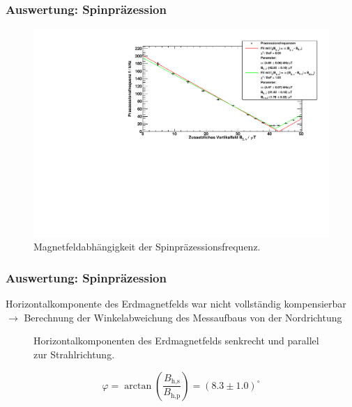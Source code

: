 \begin{frame}
\frametitle{Auswertung: Spinpräzession}

\begin{figure}
    \centering
    \includegraphics[width=\textwidth]{../img/Rb85.pdf}
    \caption{Magnetfeldabhängigkeit der Spinpräzessionsfrequenz.}  
\end{figure} 
  
\end{frame}


\begin{frame}
\frametitle{Auswertung: Spinpräzession}

Horizontalkomponente des Erdmagnetfelds war nicht vollständig kompensierbar
$\to$ Berechnung der Winkelabweichung des Messaufbaus von der Nordrichtung


\begin{figure}
    \centering
    \def\svgwidth{0.5\textwidth}
    
    \caption{Horizontalkomponenten des Erdmagnetfelds senkrecht und parallel zur Strahlrichtung.}
\end{figure}

\begin{equation*}
    \varphi = \arctan\left( \frac{B_\text{h,s}}{B_\text{h,p}} \right)
    = (8.3 \pm 1.0)^\circ
\end{equation*}
  
\end{frame}

